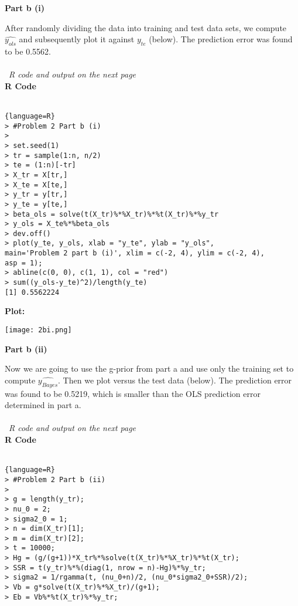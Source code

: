 \documentclass[12pt]{article}
\newenvironment{problem}[2][Problem]{\begin{trivlist}
\item[\hskip \labelsep {\bfseries #1}\hskip \labelsep {\bfseries #2.}]}{\end{trivlist}}
\begin{document}
\begin{problem}{2}
\begin{flushleft}
\textbf{Part b (i)}
\end{flushleft}
After randomly dividing the data into training and test data sets, we compute $\hat{y_{ols}}$ and subsequently plot it against $y_{te}$ (below). The prediction error was found to be 0.5562. 
\\
\\\
\textit{R code and output on the next page}\\
\newpage
\textbf{R Code} 
\\\
\begin{lstlisting}{language=R}
> #Problem 2 Part b (i)
> 
> set.seed(1)
> tr = sample(1:n, n/2)
> te = (1:n)[-tr]
> X_tr = X[tr,]
> X_te = X[te,]
> y_tr = y[tr,]
> y_te = y[te,]
> beta_ols = solve(t(X_tr)%*%X_tr)%*%t(X_tr)%*%y_tr
> y_ols = X_te%*%beta_ols
> dev.off()
> plot(y_te, y_ols, xlab = "y_te", ylab = "y_ols", 
main='Problem 2 part b (i)', xlim = c(-2, 4), ylim = c(-2, 4), 
asp = 1);
> abline(c(0, 0), c(1, 1), col = "red")
> sum((y_ols-y_te)^2)/length(y_te)
[1] 0.5562224
\end{lstlisting} 
\textbf{Plot:} \\
\begin{center}
\texttt{[image: 2bi.png]}
\end{center}
\begin{flushleft}
\textbf{Part b (ii)}
\end{flushleft}
Now we are going to use the g-prior from part a and use only the training set to compute $\hat{y_{Bayes}}$. Then we plot versus the test data (below). The prediction error was found to be 0.5219, which is smaller than the OLS prediction error determined in part a. 
\\
\\\
\textit{R code and output on the next page}\\
\textbf{R Code} 
\\\
\begin{lstlisting}{language=R}
> #Problem 2 Part b (ii)
> 
> g = length(y_tr);
> nu_0 = 2;
> sigma2_0 = 1;
> n = dim(X_tr)[1];
> m = dim(X_tr)[2];
> t = 10000;
> Hg = (g/(g+1))*X_tr%*%solve(t(X_tr)%*%X_tr)%*%t(X_tr);
> SSR = t(y_tr)%*%(diag(1, nrow = n)-Hg)%*%y_tr;
> sigma2 = 1/rgamma(t, (nu_0+n)/2, (nu_0*sigma2_0+SSR)/2);
> Vb = g*solve(t(X_tr)%*%X_tr)/(g+1);
> Eb = Vb%*%t(X_tr)%*%y_tr;

\end{lstlisting}
\end{problem}
\end{document}
